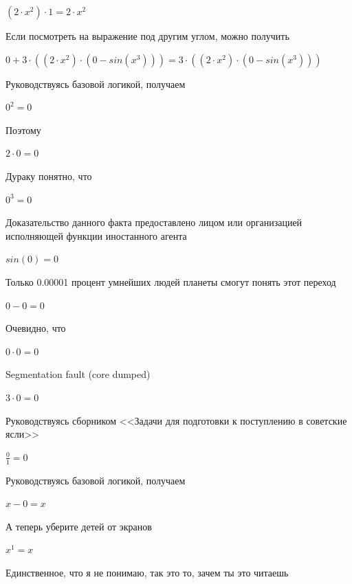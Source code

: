 \documentclass[12pt,a4paper,fleqn]{article}
\begin{document}
\begin{center}
$(2 \cdot x^{2}) \cdot 1 = 2 \cdot x^{2}$\end{center}
Если посмотреть на выражение под другим углом, можно получить

\begin{center}
$0+3 \cdot ((2 \cdot x^{2}) \cdot (0-sin(x^{3}))) = 3 \cdot ((2 \cdot x^{2}) \cdot (0-sin(x^{3})))$\end{center}
Руководствуясь базовой логикой, получаем

\begin{center}$0^{2} = 0$\end{center}
Поэтому

\begin{center}$2 \cdot 0 = 0$\end{center}
Дураку понятно, что

\begin{center}$0^{3} = 0$\end{center}
Доказательство данного факта предоставлено лицом или организацией исполняющей функции иностанного агента

\begin{center}$sin(0) = 0$\end{center}
Только 0.00001 процент умнейших людей планеты смогут понять этот переход

\begin{center}$0-0 = 0$\end{center}
Очевидно, что

\begin{center}$0 \cdot 0 = 0$\end{center}
Segmentation fault (core dumped)

\begin{center}$3 \cdot 0 = 0$\end{center}
Руководствуясь сборником <<Задачи для подготовки к поступлению в советские ясли>>\cite{link1}

\begin{center}$\frac{0}{1} = 0$\end{center}
Руководствуясь базовой логикой, получаем

\begin{center}
$x-0 = x$\end{center}
А теперь уберите детей от экранов

\begin{center}
$x^{1} = x$\end{center}
Единственное, что я не понимаю, так это то, зачем ты это читаешь
\end{document}
